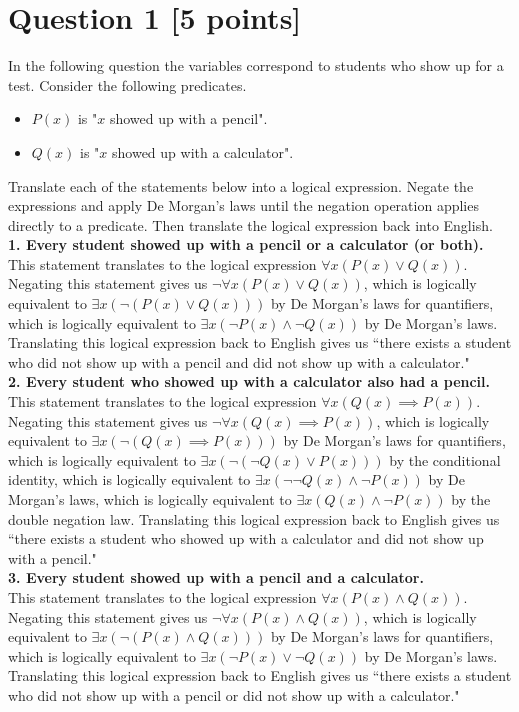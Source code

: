 \documentclass{report}
\theoremstyle{mytheoremstyle}
\theoremstyle{mytheoremstyle}
\theoremstyle{myproblemstyle}
\begin{document}
\section*{Question 1 [5 points]}
In the following question the variables correspond to students who show up for a test. Consider the following predicates. 
\begin{itemize}
    \item $P(x)$ is "$x$ showed up with a pencil".
    \item $Q(x)$ is "$x$ showed up with a calculator".
\end{itemize}
Translate each of the statements below into a logical expression. Negate the expressions and apply De Morgan's laws until the negation operation applies directly to a predicate. Then translate the logical expression back into English. \\[\baselineskip]
\noindent\textbf{1. Every student showed up with a pencil or a calculator (or both).} 
\\[\baselineskip]
This statement translates to the logical expression $\forall x (P(x) \lor Q(x))$. Negating this statement gives us $\neg \forall x (P(x) \lor Q(x))$, which is logically equivalent to $\exists x (\neg(P(x) \lor Q(x)))$ by De Morgan's laws for quantifiers, which is logically equivalent to $\exists x (\neg P(x) \land \neg Q(x))$ by De Morgan's laws. Translating this logical expression back to English gives us ``there exists a student who did not show up with a pencil and did not show up with a calculator." 
\\[\baselineskip]
\noindent\textbf{2. Every student who showed up with a calculator also had a pencil.} 
\\[\baselineskip]
This statement translates to the logical expression $\forall x (Q(x) \implies P(x))$. Negating this statement gives us $\neg \forall x (Q(x) \implies P(x))$, which is logically equivalent to $\exists x (\neg (Q(x) \implies P(x)))$ by De Morgan's laws for quantifiers, which is logically equivalent to $\exists x (\neg (\neg Q(x) \lor P(x)))$ by the conditional identity, which is logically equivalent to $\exists x (\neg \neg Q(x) \land \neg P(x))$ by De Morgan's laws, which is logically equivalent to $\exists x (Q(x) \land \neg P(x))$ by the double negation law. Translating this logical expression back to English gives us ``there exists a student who showed up with a calculator and did not show up with a pencil."
\\[\baselineskip]
\noindent\textbf{3. Every student showed up with a pencil and a calculator.}
\\[\baselineskip]
This statement translates to the logical expression $\forall x (P(x) \land Q(x))$. Negating this statement gives us $\neg \forall x (P(x) \land Q(x))$, which is logically equivalent to $\exists x (\neg (P(x) \land Q(x)))$ by De Morgan's laws for quantifiers, which is logically equivalent to $\exists x (\neg P(x) \lor \neg Q(x))$ by De Morgan's laws. Translating this logical expression back to English gives us ``there exists a student who did not show up with a pencil or did not show up with a calculator."
\newpage
\end{document}
